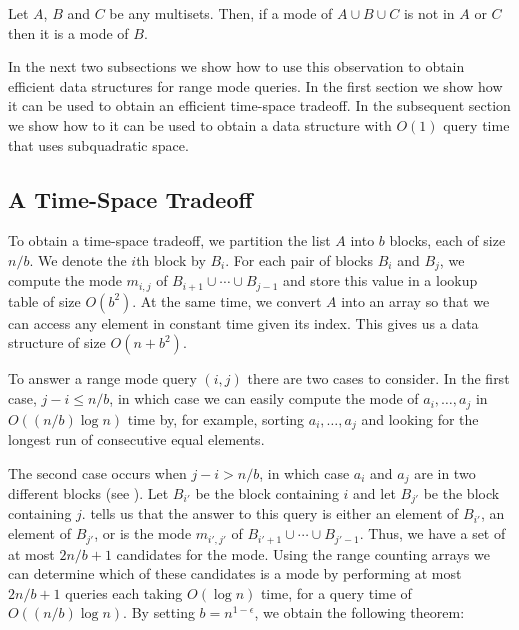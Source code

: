 \documentclass{njcarticle}
\begin{document}
\begin{lemma}
Let $A$, $B$ and $C$ be any multisets.  Then, if a mode of $A\cup B\cup C$ is not in
$A$ or $C$ then it is a mode of $B$.
\end{lemma}

In the next two subsections we show how to use this observation to
obtain efficient data structures for range mode queries.  In the first
section we show how it can be used to obtain an efficient time-space
tradeoff.  In the subsequent section we show how to it can be used to
obtain a data structure with $O(1)$ query time that uses subquadratic
space.

\subsection{A Time-Space Tradeoff}

To obtain a time-space tradeoff, we partition the list $A$ into $b$
blocks, each of size $n/b$.  We denote the $i$th block by $B_i$.  For
each pair of blocks $B_i$ and $B_j$, we compute the mode $m_{i,j}$ of
$B_{i+1}\cup\cdots\cup B_{j-1}$ and store this value in a lookup table
of size $O(b^2)$.  At the same time, we convert $A$ into an array so
that we can access any element in constant time given its index.  This
gives us a data structure of size $O(n+b^2)$. 

To answer a range mode query $(i,j)$ there are two cases to consider.
In the first case, $j-i\le n/b$, in which case we can easily compute
the mode of $a_i,\ldots,a_j$ in $O((n/b)\log n)$ time by, for example,
sorting $a_i,\ldots,a_j$ and looking for the longest run of
consecutive equal elements.

The second case occurs when $j-i > n/b$, in which case $a_i$ and $a_j$
are in two different blocks (see ).  Let $B_{i'}$
be the block containing $i$ and let $B_{j'}$ be the block containing
$j$.   tells us that the answer to this query is
either an element of $B_{i'}$, an element of $B_{j'}$, or is the mode
$m_{i',j'}$ of $B_{i'+1}\cup\cdots\cup B_{j'-1}$.  Thus, we have a set
of at most $2n/b+1$ candidates for the mode. Using the range counting
arrays we can determine which of these candidates is a mode by
performing at most $2n/b+1$ queries each taking $O(\log n)$ time, for
a query time of $O((n/b)\log n)$.  By setting $b=n^{1-\epsilon}$, we
obtain the following theorem:
\end{document}
